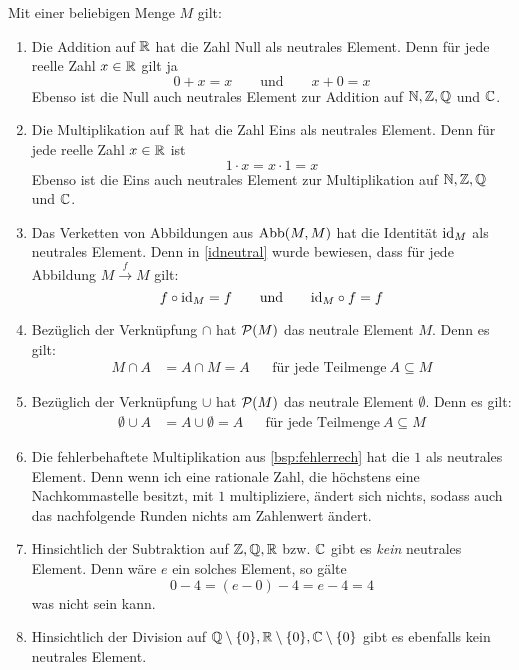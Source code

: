\begin{bsp} \label{bsp:neutrales}
    Mit einer beliebigen Menge $M$ gilt:
    \begin{enumerate}
        \item Die Addition auf $\mathbb R$ hat die Zahl Null als neutrales Element. Denn für jede reelle Zahl $x\in \mathbb R$ gilt ja
            \[ 0+x=x \qquad\text{und}\qquad x+0=x \]
        Ebenso ist die Null auch neutrales Element zur Addition auf $\mathbb N,\mathbb Z,\mathbb Q$ und $\mathbb C$.
        \item Die Multiplikation auf $\mathbb R$ hat die Zahl Eins als neutrales Element. Denn für jede reelle Zahl $x\in \mathbb R$ ist
            \[ 1\cdot x = x\cdot 1= x \]
        Ebenso ist die Eins auch neutrales Element zur Multiplikation auf $\mathbb N,\mathbb Z,\mathbb Q$ und $\mathbb C$.
        \item Das Verketten von Abbildungen aus $\operatorname{Abb}(M,M)$ hat die Identität $\mathrm{id}_M$ als neutrales Element. Denn in \cref{idneutral} wurde bewiesen, dass für jede Abbildung $M\xrightarrow{f} M$ gilt:
            \[ f\circ \mathrm{id}_M = f \qquad\text{und}\qquad \mathrm{id}_M \circ f = f \]
        \item Bezüglich der Verknüpfung $\cap$ hat $\mathcal P(M)$ das neutrale Element $M$. Denn es gilt:
        \begin{align*}
            M\cap A & = A\cap M = A && \text{für jede Teilmenge}\ A\subseteq M
        \end{align*}
        \item Bezüglich der Verknüpfung $\cup$ hat $\mathcal P(M)$ das neutrale Element $\emptyset$. Denn es gilt:
        \begin{align*}
            \emptyset\cup A & = A\cup \emptyset = A && \text{für jede Teilmenge}\ A\subseteq M
        \end{align*}
        \item Die fehlerbehaftete Multiplikation aus \cref{bsp:fehlerrech} hat die $1$ als neutrales Element. Denn wenn ich eine rationale Zahl, die höchstens eine Nachkommastelle besitzt, mit $1$ multipliziere, ändert sich nichts, sodass auch das nachfolgende Runden nichts am Zahlenwert ändert.
        \item Hinsichtlich der Subtraktion auf $\mathbb Z,\mathbb Q,\mathbb R$ bzw. $\mathbb C$ gibt es \emph{kein} neutrales Element. Denn wäre $e$ ein solches Element, so gälte
            \[ 0-4 = (e-0)-4 = e-4 = 4 \]
        was nicht sein kann.
        \item Hinsichtlich der Division auf $\mathbb Q\setminus \{0\},\mathbb R\setminus \{0\},\mathbb C\setminus \{0\}$ gibt es ebenfalls kein neutrales Element.
    \end{enumerate}
\end{bsp}


